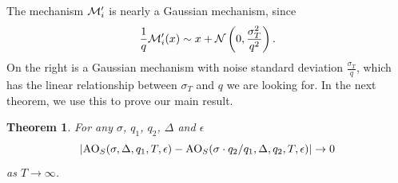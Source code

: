 \documentclass{article}
\theoremstyle{plain}
\newtheorem{theorem}{Theorem}[section]
\theoremstyle{definition}
\theoremstyle{remark}
\begin{document}
The mechanism $\mathcal{M}_i'$ is nearly a Gaussian mechanism, since 
\begin{equation}
    \frac{1}{q}\mathcal{M}_i'(x) \sim x + \mathcal{N}\left(0, \frac{\sigma_T^2}{q^2}\right).\label{eq:approx-mech-is-almost-gaussian}
\end{equation}
On the right is a Gaussian mechanism with noise standard deviation $\frac{\sigma_T}{q}$, which has
the linear relationship between $\sigma_T$ and $q$ we are looking for. In the next theorem, we use this 
to prove our main result.
\begin{theorem}\label{thm:subsampled-mech-ao-convergence}
    For any $\sigma$, $q_1$, $q_2$, $\Delta$ and $\epsilon$
    \begin{equation}
        |\mathrm{AO}_S(\sigma, \Delta, q_1, T, \epsilon) - \mathrm{AO}_S(\sigma\cdot q_2 / q_1, \Delta, q_2, T, \epsilon)| \to 0
    \end{equation}
    as $T \to \infty$.
\end{theorem}
\end{document}

